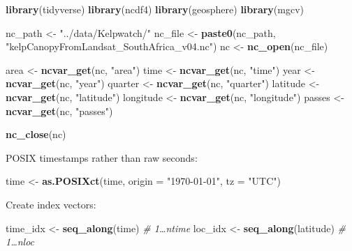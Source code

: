 \documentclass[
  british,
  10pt,
]{article}
\newenvironment{Shaded}{\begin{snugshade}}{\end{snugshade}}
\newcommand{\AttributeTok}[1]{\textcolor[rgb]{0.13,0.29,0.53}{#1}}
\newcommand{\CommentTok}[1]{\textcolor[rgb]{0.56,0.35,0.01}{\textit{#1}}}
\newcommand{\FunctionTok}[1]{\textcolor[rgb]{0.13,0.29,0.53}{\textbf{#1}}}
\newcommand{\NormalTok}[1]{#1}
\newcommand{\OtherTok}[1]{\textcolor[rgb]{0.56,0.35,0.01}{#1}}
\newcommand{\StringTok}[1]{\textcolor[rgb]{0.31,0.60,0.02}{#1}}
\begin{document}
\begin{Shaded}
\begin{Highlighting}[]
\FunctionTok{library}\NormalTok{(tidyverse)}
\FunctionTok{library}\NormalTok{(ncdf4)}
\FunctionTok{library}\NormalTok{(geosphere)}
\FunctionTok{library}\NormalTok{(mgcv)}

\NormalTok{nc\_path }\OtherTok{\textless{}{-}} \StringTok{"../data/Kelpwatch/"}
\NormalTok{nc\_file }\OtherTok{\textless{}{-}} \FunctionTok{paste0}\NormalTok{(nc\_path, }\StringTok{"kelpCanopyFromLandsat\_SouthAfrica\_v04.nc"}\NormalTok{)}
\NormalTok{nc }\OtherTok{\textless{}{-}} \FunctionTok{nc\_open}\NormalTok{(nc\_file)}

\NormalTok{area }\OtherTok{\textless{}{-}} \FunctionTok{ncvar\_get}\NormalTok{(nc, }\StringTok{"area"}\NormalTok{)}
\NormalTok{time }\OtherTok{\textless{}{-}} \FunctionTok{ncvar\_get}\NormalTok{(nc, }\StringTok{"time"}\NormalTok{)}
\NormalTok{year }\OtherTok{\textless{}{-}} \FunctionTok{ncvar\_get}\NormalTok{(nc, }\StringTok{"year"}\NormalTok{)}
\NormalTok{quarter }\OtherTok{\textless{}{-}} \FunctionTok{ncvar\_get}\NormalTok{(nc, }\StringTok{"quarter"}\NormalTok{)}
\NormalTok{latitude }\OtherTok{\textless{}{-}} \FunctionTok{ncvar\_get}\NormalTok{(nc, }\StringTok{"latitude"}\NormalTok{)}
\NormalTok{longitude }\OtherTok{\textless{}{-}} \FunctionTok{ncvar\_get}\NormalTok{(nc, }\StringTok{"longitude"}\NormalTok{)}
\NormalTok{passes }\OtherTok{\textless{}{-}} \FunctionTok{ncvar\_get}\NormalTok{(nc, }\StringTok{"passes"}\NormalTok{)}

\FunctionTok{nc\_close}\NormalTok{(nc)}
\end{Highlighting}
\end{Shaded}

POSIX timestamps rather than raw seconds:

\begin{Shaded}
\begin{Highlighting}[]
\NormalTok{time }\OtherTok{\textless{}{-}} \FunctionTok{as.POSIXct}\NormalTok{(time, }\AttributeTok{origin =} \StringTok{"1970{-}01{-}01"}\NormalTok{, }\AttributeTok{tz =} \StringTok{"UTC"}\NormalTok{)}
\end{Highlighting}
\end{Shaded}

Create index vectors:

\begin{Shaded}
\begin{Highlighting}[]
\NormalTok{time\_idx }\OtherTok{\textless{}{-}} \FunctionTok{seq\_along}\NormalTok{(time) }\CommentTok{\# 1…ntime}
\NormalTok{loc\_idx }\OtherTok{\textless{}{-}} \FunctionTok{seq\_along}\NormalTok{(latitude) }\CommentTok{\# 1…nloc}
\end{Highlighting}
\end{Shaded}
\end{document}
